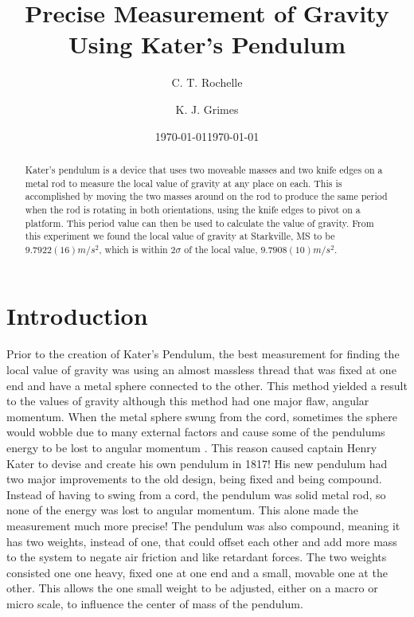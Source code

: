 \documentclass[aps,prl,10pt,twocolumn,floatfix]{revtex4-2}
\begin{document}
\begin{abstract}
Kater's pendulum is a device that uses two moveable masses and two knife edges on a metal rod to measure the local value of gravity at any place on each. 
This is accomplished by moving the two masses around on the rod to produce the same period when the rod is rotating in both orientations, using the knife edges to pivot on a platform. 
This period value can then be used to calculate the value of gravity.
From this experiment we found the local value of gravity at Starkville, MS to be $9.7922(16)m/s^2$, which is within $2\sigma$ of the local value, $9.7908(10)m/s^2$.
\end{abstract}


\title{Precise Measurement of Gravity Using Kater's Pendulum}
\author{C. T. Rochelle}
\author{K. J. Grimes}
\date{\today}
\date{\today}

\maketitle

\section{Introduction}\label{Intro}
Prior to the creation of Kater's Pendulum, the best measurement for finding the local value of gravity was using an almost massless thread that was fixed at one end and have a metal sphere connected to the other. 
This method yielded a result to the values of gravity although this method had one major flaw, angular momentum.
When the metal sphere swung from the cord, sometimes the sphere would wobble due to many external factors and cause some of the pendulums energy to be lost to angular momentum \cite{BeforeKater}. 
This reason caused captain Henry Kater to devise and create his own pendulum in 1817\cite{KatersWork}!
His new pendulum had two major improvements to the old design, being fixed and being compound. 
Instead of having to swing from a cord, the pendulum was solid metal rod, so none of the energy was lost to angular momentum. 
This alone made the measurement much more precise!
The pendulum was also compound, meaning it has two weights, instead of one, that could offset each other and add more mass to the system to negate air friction and like retardant forces. 
The two weights consisted one one heavy, fixed one at one end and a small, movable one at the other. 
This allows the one small weight to be adjusted, either on a macro or micro scale, to influence the center of mass of the pendulum.  
\end{document}
